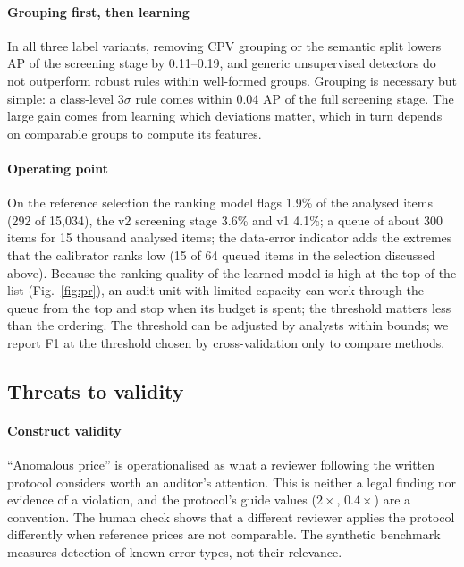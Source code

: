 \documentclass[conference]{IEEEtran}
\begin{document}
\paragraph{Grouping first, then learning} In all three label variants, removing CPV grouping or the
semantic split lowers AP of the screening stage by 0.11--0.19, and generic unsupervised detectors do not
outperform robust rules within well-formed groups. Grouping is necessary but simple: a class-level
3$\sigma$ rule comes within 0.04 AP of the full screening stage. The large gain comes from learning which
deviations matter, which in turn depends on comparable groups to compute its features.

\paragraph{Operating point} On the reference selection the ranking model flags 1.9\% of the analysed items
(292 of 15{,}034), the v2 screening stage 3.6\% and v1 4.1\%; a queue of about 300 items for 15 thousand
analysed items; the data-error indicator adds the extremes that the calibrator ranks low (15 of 64 queued
items in the selection discussed above). Because the ranking quality of the
learned model is high at the top of the list (Fig.~\ref{fig:pr}), an audit unit with limited capacity
can work through the queue from the top and stop when its budget is spent; the threshold matters less than
the ordering. The threshold can be adjusted by analysts within bounds; we report F1 at the threshold chosen
by cross-validation only to compare methods.

\subsection{Threats to validity}

\paragraph{Construct validity} ``Anomalous price'' is operationalised as what a reviewer following the
written protocol considers worth an auditor's attention. This is neither a legal finding nor evidence of
a violation, and the protocol's guide values ($2\times$, $0.4\times$) are a convention. The human check
shows that a different reviewer applies the protocol differently when reference prices are not comparable.
The synthetic benchmark measures detection of known error types, not their relevance.
\end{document}
